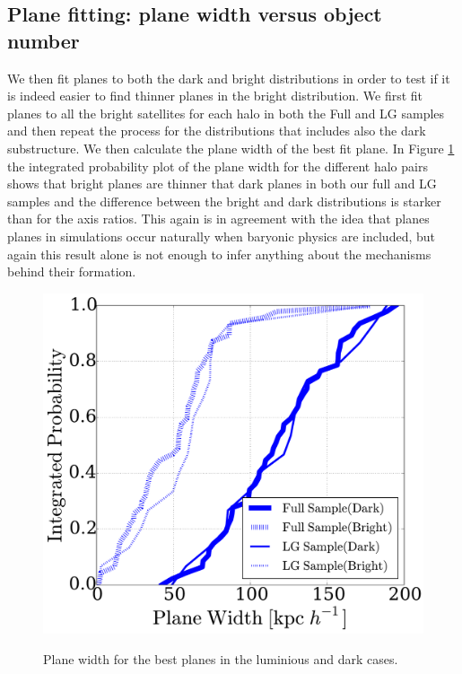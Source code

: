 \documentclass{emulateapj}
\begin{document}
\subsection{Plane fitting: plane width versus object number}
\label{DarkBright}
We then fit planes to both the dark and bright distributions in order to test if it is indeed easier to find thinner planes in the bright distribution. 
We first fit planes to all the bright satellites for each halo in both the Full and LG samples and then repeat the process for the distributions that includes also the dark substructure.
We then calculate the plane width of the best fit plane. %
In Figure \ref{fig:plane_width} the integrated probability plot of the plane width for the different halo pairs shows that bright planes are thinner that dark planes in both our full and LG samples and the difference between the bright and dark distributions is starker than for the axis ratios. 
This again is in agreement with the idea that planes planes in simulations occur naturally when baryonic physics are included, but again this result alone is not enough to infer anything about the mechanisms behind their formation.\\ 

\begin{figure}
\centering
\includegraphics[width=\hsize]{plane_width.pdf}\\
\caption{Plane width for the best planes in the luminious and dark cases.}
\label{fig:plane_width}
\end{figure}
\end{document}
